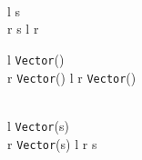       {\oplus \in \set{>, \geq, <, \leq} \\  \\\\%
       \Gamma \vdash l \Rightarrow s \\ \Gamma \vdash r \Rightarrow s}
      {\Gamma \vdash l \oplus r \Rightarrow {}}


      {\Gamma \vdash l \Rightarrow \texttt{Vector}() \\ \Gamma \vdash r \Rightarrow \texttt{Vector}()}
      {\Gamma \vdash l \times r \Rightarrow \texttt{Vector}()}


      { \\ \Gamma \vdash l \Rightarrow \texttt{Vector}(s) \\ \Gamma \vdash r \Rightarrow \texttt{Vector}(s)}
      {\Gamma \vdash l \cdot{} r \Rightarrow s}


